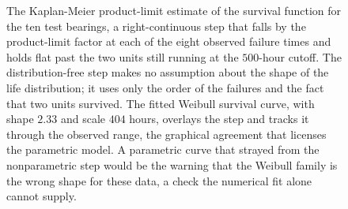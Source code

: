 \begin{figure}[htbp]
\centering
{}
\caption[Kaplan-Meier survival estimate against the fitted Weibull]{The
Kaplan-Meier product-limit estimate of the survival function for the ten
test bearings, a right-continuous step that falls by the product-limit
factor at each of the eight observed failure times and holds flat past
the two units still running at the $500$-hour cutoff. The distribution-free
step makes no assumption about the shape of the life distribution; it uses
only the order of the failures and the fact that two units survived. The
fitted Weibull survival curve, with shape $2.33$ and scale $404$ hours,
overlays the step and tracks it through the observed range, the graphical
agreement that licenses the parametric model. A parametric curve that
strayed from the nonparametric step would be the warning that the Weibull
family is the wrong shape for these data, a check the numerical fit alone
cannot supply.}
\label{fig:vol02ch14:kaplan-meier}
\end{figure}
